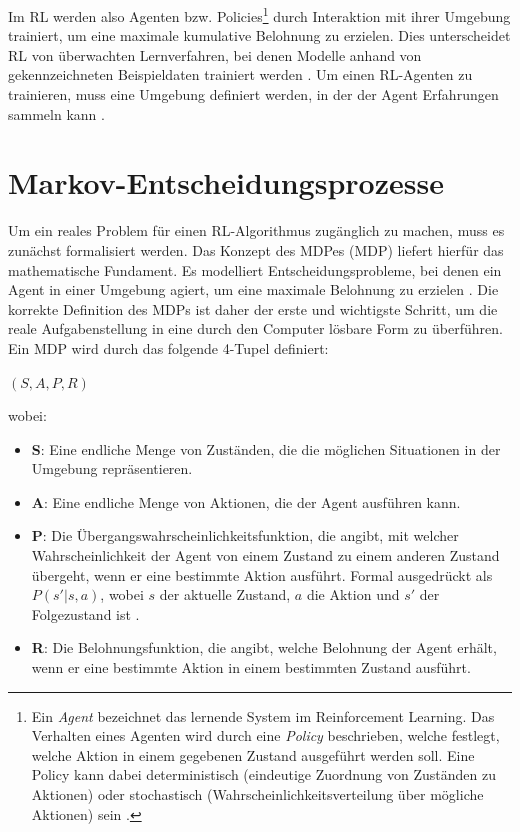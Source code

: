 Im \ac{RL} werden also Agenten bzw. Policies\footnote{Ein \textit{Agent} bezeichnet das lernende System im Reinforcement Learning. Das Verhalten eines Agenten wird durch eine \textit{Policy} beschrieben, welche festlegt, welche Aktion in einem gegebenen Zustand ausgeführt werden soll. Eine Policy kann dabei deterministisch (eindeutige Zuordnung von Zuständen zu Aktionen) oder stochastisch (Wahrscheinlichkeitsverteilung über mögliche Aktionen) sein \cite[Kap. 3.1]{sutton2018rl}.} durch Interaktion mit ihrer Umgebung trainiert, um eine maximale kumulative Belohnung zu erzielen.
Dies unterscheidet \ac{RL} von überwachten Lernverfahren, bei denen Modelle anhand von gekennzeichneten Beispieldaten trainiert werden \cite[Kap. 1]{sutton2018rl}.
Um einen \ac{RL}\hyp{}Agenten zu trainieren, muss eine Umgebung definiert werden, in der der Agent Erfahrungen sammeln kann \cite{gymnasium_basic_usage}.


\section{Markov\hyp{}Entscheidungsprozesse}
Um ein reales Problem für einen \ac{RL}\hyp{}Algorithmus zugänglich zu machen, muss es zunächst formalisiert werden. Das Konzept des \acl{MDP}es (\acs{MDP}) liefert hierfür das mathematische Fundament. Es modelliert Entscheidungsprobleme, bei denen ein Agent in einer Umgebung agiert, um eine maximale Belohnung zu erzielen \cite[Kap. 3]{sutton2018rl}. Die korrekte Definition des MDPs ist daher der erste und wichtigste Schritt, um die reale Aufgabenstellung in eine durch den Computer lösbare Form zu überführen.
Ein \acs{MDP} wird durch das folgende 4\hyp{}Tupel definiert:
\medskip

\((S, A, P, R)\)
\medskip

wobei:
\begin{itemize}
    \item \textbf{S}: Eine endliche Menge von Zuständen, die die möglichen Situationen in der Umgebung repräsentieren.
    \item \textbf{A}: Eine endliche Menge von Aktionen, die der Agent ausführen kann.
    \item \textbf{P}: Die Übergangswahrscheinlichkeitsfunktion, die angibt, mit welcher Wahrscheinlichkeit der Agent von einem Zustand zu einem anderen Zustand übergeht,
    wenn er eine bestimmte Aktion ausführt. Formal ausgedrückt als \(P(s'|s,a)\), wobei \(s\) der aktuelle Zustand, \(a\) die Aktion und \(s'\) der Folgezustand ist \cite[Kap. 3.1]{sutton2018rl}.
    \item \textbf{R}: Die Belohnungsfunktion, die angibt, welche Belohnung der Agent erhält, wenn er eine bestimmte Aktion in einem bestimmten Zustand ausführt.
\end{itemize}

